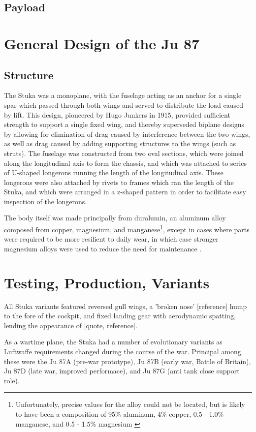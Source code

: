 \documentclass[a4paper, fontsize=11pt]{scrartcl} %
\begin{document}
\subsection{Payload}
\section{General Design of the Ju 87}
\subsection{Structure}
The Stuka was a monoplane, with the fuselage acting as an
anchor for a single spar which passed through both wings and served to
distribute the load caused by lift.
This design, pioneered by Hugo Junkers in 1915, provided sufficient
strength to support a single fixed wing, and thereby superseded
biplane designs by allowing for elimination of drag caused by interference
between the two wings, as well as drag caused by adding supporting structures
to the wings (such as struts). The fuselage was constructed from two oval
sections, which were joined along the longitudinal axis to form the
chassis, and which was attached to series of U-shaped longerons running
the length of the longitudinal axis. These longerons were also attached
by rivets to frames which ran the length of the Stuka, and which were
arranged in a z-shaped pattern in order to facilitate easy inspection of
the longerons.

The body itself was made principally from
duralumin, an aluminum alloy composed from copper, magnesium, and
manganese\footnote{Unfortunately, precise values for the alloy could not
be located, but is likely to have been a composition of 95\% aluminum, 4\%
copper, 0.5 - 1.0\% manganese, and 0.5 - 1.5\%
magnesium \autocite[p.~102-103]{wardlaw33}},
except in cases where parts were required to be more resilient to daily
wear, in which case stronger magnesium alloys were used to reduce the
need for maintenance \autocite[p.~15]{guardia14}.

\section{Testing, Production, Variants}
All Stuka variants featured reversed gull wings, a 'broken nose' [reference]
hump to the fore of the cockpit, and fixed landing gear with aerodynamic
spatting\autocite[p.~4]{curry88}, lending the
appearance of [quote, reference]. %

As a wartime plane, the Stuka had a number of evolutionary variants as
Luftwaffe requirements changed during the course of the war. Principal among these were the Ju 87A
(pre-war prototype), Ju 87B (early war, Battle of Britain), Ju 87D
(late war, improved performace), and Ju 87G (anti tank close support
role).
\end{document}
